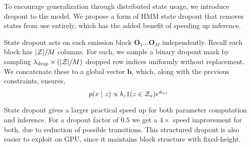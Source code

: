 \documentclass[11pt,a4paper]{article}
\begin{document}
To encourage generalization through distributed state usage, we introduce dropout to the model. 
We propose a form of HMM state dropout that removes states from use entirely,
which has the added benefit of speeding up inference.



State dropout acts on each emission block $\mathbf{O}_1 \ldots \mathbf{O}_M$ independently.
Recall each block has $|{\cal Z}| / M$ columns.
For each, we sample a binary dropout mask by sampling
$ \lambda_{\text{drop}} \times(|{\cal Z}| / M)$ dropped row indices uniformly without replacement.
We concatenate these to a global vector $\mathbf{b}$, which, along with the previous constraints,  ensures,
\begin{equation}
\label{eqn:state_dropout}
p(x \mid z) \propto b_{z}1(z \in \mathcal{Z}_x)e^{\phi_{xz}}
\end{equation}

State dropout gives a larger practical speed up for both parameter computation and inference.
For a dropout factor of $0.5$ we get a $4\times$ speed improvement for both,
due to reduction of possible transitions.
This structured dropout is also easier to exploit on GPU,
since it maintains block structure with fixed-height.






\end{document}
